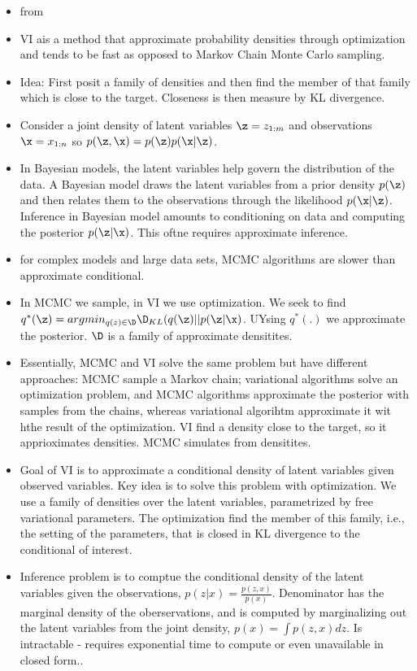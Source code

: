 \begin{itemize}
    \item from \cite{BleiKucukelbircAuliffe}
    \item VI ais a method that approximate probability densities through optimization and tends to be fast as opposed to Markov Chain Monte Carlo sampling. 
    \item Idea: First posit a family of densities and then find the member of that family which is close to the target. Closeness is then measure by KL divergence. 
    \item Consider a joint density of latent variables $\z = z_{1:m}$ and observations $\x = x_{1:n}$ so $p(\z,\x) = p(\z)p(\x|\z)$.
    \item In Bayesian models, the latent variables help govern the distribution of the data. A Bayesian model draws the latent variables from a prior density $p(\z)$ and then relates them to the observations through the likelihood $p(\x | \z)$. Inference in Bayesian model amounts to conditioning on data and computing the posterior $p(\z | \x)$. This oftne requires approximate inference.
    \item for complex models and large data sets, MCMC algorithms are slower than approximate conditional.
    \item In MCMC we sample, in VI we use optimization. We seek to find $q^*(\z) = argmin_{q(z)\in \D} \D_{KL}(q(\z)||p(\z|\x)$. UYsing $q^*(.)$ we approximate the posterior. $\D$ is a family of approximate densitites.
    \item Essentially, MCMC and VI solve the same problem but have different approaches: MCMC sample a Markov chain; variational algorithms solve an optimization problem, and MCMC algorithms approximate the posterior with samples from the chains, whereas variational algorihtm approximate it wit hthe result of the optimization.
    \items VI find a density close to the target, so it apprioximates densities. MCMC simulates from densitites.
    \item Goal of VI is to approximate a conditional density of latent variables given observed variables. Key idea is to solve this problem with optimization. We use a family of densities over the latent variables, parametrized by free variational parameters. The optimization find the member of this family, i.e., the setting of the parameters, that is closed in KL divergence to the conditional of interest. 
    \item Inference problem is to comptue the conditional density of the latent variables given the observations, $p(z|x) = \frac{p(z,x)}{p(x)}$. Denominator has the marginal density of the oberservations, and is computed by marginalizing out the latent variables from the joint density, $p(x) = \int p(z,x)dz$. Is intractable - requires exponential time to compute or even unavailable in closed form..  

\end{itemize}
